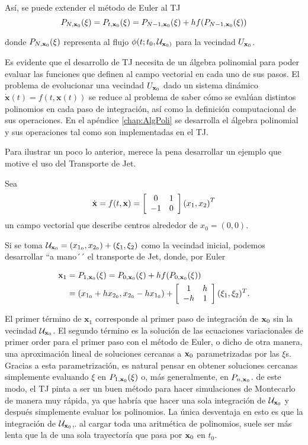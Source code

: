 Así, se puede extender el método de Euler al TJ 
\begin{equation}
P_{N,\mathbf{x}_0}(\xi) = P_{t,\mathbf{x}_0}(\xi) = P_{N-1,\mathbf{x}_0}(\xi) + h f(P_{N-1,\mathbf{x}_0}(\xi))
\label{eulerU}
\end{equation}

donde $P_{N,\mathbf{x}_0}(\xi)$ representa al flujo $\phi(t;t_0,\mathcal{U}_{\mathbf{x}_0)}$ para la vecindad $U_{\mathbf{x}_0}$.

Es evidente que el desarrollo de TJ necesita de un álgebra polinomial para poder evaluar las funciones que definen al campo vectorial en cada uno de sus pasos. El problema de evolucionar una vecindad $U_{\mathbf{x}_0}$ dado un sistema dinámico $\dot{\mathbf{x}}(t) = f(t,\mathbf{x}(t))$ se reduce al problema de saber cómo se evalúan distintos polinomios en cada paso de integración, así como la definición computacional de sus operaciones. En el apéndice \ref{chap:AlgPoli} se desarrolla el álgebra polinomial y sus operaciones tal como son implementadas en el TJ.  

Para ilustrar un poco lo anterior, merece la pena desarrollar un ejemplo que motive el uso del Transporte de Jet.

Sea
\begin{align}
\dot{\mathbf{x}} = f(t,\mathbf{x}) = \left[ \begin{array}{cc}
 0 & 1  \\
-1 & 0  \\
\end{array} \right] \left( x_1, x_2 \right)^T
\label{center}
\end{align}
un campo vectorial que describe centros alrededor de $x_0 = (0,0)$. 

Si se toma $\mathcal{U}_{\mathbf{x}_0} = (x_{1_0},x_{2_0}) + (\xi_1,\xi_2)$ como la vecindad inicial, podemos desarrollar ``a mano´´ el transporte de Jet, donde, por Euler

\begin{align*}
\mathbf{x}_1 &= P_{1,\mathbf{x}_0}(\xi) = P_{0,\mathbf{x}_0}(\xi) + h f(P_{0,\mathbf{x}_0}(\xi)) \\
&= (x_{1_0} + h x_{2_0}, x_{2_0} - h x_{1_0}) + \left[ \begin{array}{cc}
 1 & h  \\
-h & 1  \\
\end{array} \right] (\xi_1,\xi_2)^T.
\end{align*} 

El primer término de $\mathbf{x}_1$ corresponde al primer paso de integración de $\mathbf{x}_0$ sin la vecindad $\mathcal{U}_{\mathbf{x}_0}$. El segundo término es la solución de las ecuaciones variacionales de primer order para el primer paso con el método de Euler, o dicho de otra manera, una aproximación lineal de soluciones cercanas a $\mathbf{x}_0$ parametrizadas por las $\xi$s. Gracias a esta parametrización, es natural pensar en obtener soluciones cercanas simplemente evaluando $\xi$ en $P_{1,\mathbf{x}_0}(\xi)$ o, más generalmente, en $P_{n,\mathbf{x}_0}$. de este modo, el TJ pinta a ser un buen método para hacer simulaciones de Montecarlo de manera muy rápida, ya que habría que hacer una sola integración de $\mathcal{U}_{\mathbf{x}_0}$ y después simplemente evaluar los polinomios. La única desventaja en esto es que la integración de $\mathcal{U}_{\mathbf{x}_0}$,. al cargar toda una aritmética de polinomios, suele ser más lenta que la de una sola trayectoría que pasa por $\mathbf{x}_0$ en $t_0$.
 

